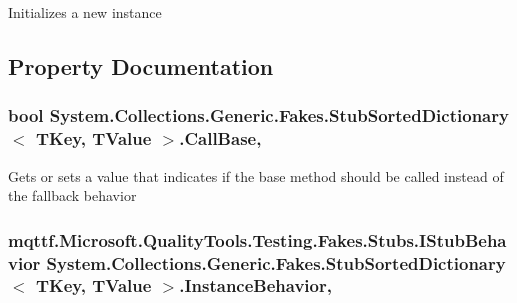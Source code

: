Initializes a new instance



\subsection{Property Documentation}
\hypertarget{class_system_1_1_collections_1_1_generic_1_1_fakes_1_1_stub_sorted_dictionary_3_01_t_key_00_01_t_value_01_4_ac206d76fad4532a1030599b81a0a4bae}{
\subsubsection[{Call\-Base}]{\setlength{\rightskip}{0pt plus 5cm}bool System.\-Collections.\-Generic.\-Fakes.\-Stub\-Sorted\-Dictionary$<$ T\-Key, T\-Value $>$.Call\-Base\hspace{0.3cm}{\ttfamily [get]}, {\ttfamily [set]}}}\label{class_system_1_1_collections_1_1_generic_1_1_fakes_1_1_stub_sorted_dictionary_3_01_t_key_00_01_t_value_01_4_ac206d76fad4532a1030599b81a0a4bae}


Gets or sets a value that indicates if the base method should be called instead of the fallback behavior

\hypertarget{class_system_1_1_collections_1_1_generic_1_1_fakes_1_1_stub_sorted_dictionary_3_01_t_key_00_01_t_value_01_4_a027ba65186839a6f67978e4b5b506f2e}{
\subsubsection[{Instance\-Behavior}]{\setlength{\rightskip}{0pt plus 5cm}mqttf.\-Microsoft.\-Quality\-Tools.\-Testing.\-Fakes.\-Stubs.\-I\-Stub\-Behavior System.\-Collections.\-Generic.\-Fakes.\-Stub\-Sorted\-Dictionary$<$ T\-Key, T\-Value $>$.Instance\-Behavior\hspace{0.3cm}{\ttfamily [get]}, {\ttfamily [set]}}}\label{class_system_1_1_collections_1_1_generic_1_1_fakes_1_1_stub_sorted_dictionary_3_01_t_key_00_01_t_value_01_4_a027ba65186839a6f67978e4b5b506f2e}


